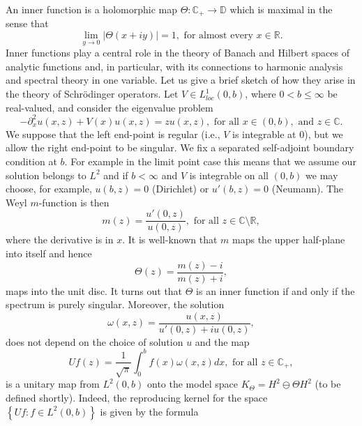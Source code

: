 \documentclass{article}[12pt]
\theoremstyle{remark}
\begin{document}
An inner function is a holomorphic map $\Theta : \mathbb{C}_{+} \to \mathbb{D}$ which is maximal in the sense that
\begin{equation*}
    \lim_{y\to 0} \lvert \Theta(x+iy)\rvert = 1, \text{ for almost every } x \in \mathbb{R}.
\end{equation*}
Inner functions play a central role in the theory of Banach and Hilbert spaces of analytic functions and, in particular, with its connections to harmonic analysis and spectral theory in one variable. Let us give a brief sketch of how they arise in the theory of Schrödinger operators. Let $V \in L^{1}_{loc}(0,b)$, where $0<b\leq \infty$ be real-valued, and consider the eigenvalue problem
\begin{equation}\label{eq:schrödinger}
    -\partial_{x}^{2}u(x,z) + V(x)u(x,z) = zu(x,z), \text{ for all } x\in (0,b), \text{ and }z \in \mathbb{C}.
\end{equation}
We suppose that the left end-point is regular (i.e., $V$ is integrable at $0$), but we allow the right end-point to be singular. We fix a separated self-adjoint boundary condition at $b$. For example in the limit point case this means that we assume our solution belongs to $L^{2}$ and if $b < \infty$ and $V$ is integrable on all $(0,b)$ we may choose, for example, $u(b,z) = 0$ (Dirichlet) or $u'(b,z) = 0$ (Neumann). The Weyl $m$-function is then
\begin{equation*}
    m(z) = \frac{u'(0,z)}{u(0,z)}, \text{ for all } z \in \mathbb{C} \setminus \mathbb{R},
\end{equation*}
where the derivative is in $x$. It is well-known that $m$ maps the upper half-plane into itself and hence
\begin{equation*}
    \Theta(z) = \frac{m(z)-i}{m(z)+i},
\end{equation*}
maps into the unit disc. It turns out that $\Theta$ is an inner function if and only if the spectrum is purely singular. Moreover, the solution
\begin{equation*}
    \omega(x,z) = \frac{u(x,z)}{u'(0,z)+iu(0,z)},    
\end{equation*}
does not depend on the choice of solution $u$ and the map
\begin{equation*}
    Uf(z) = \frac{1}{\sqrt{\pi}}\int_{0}^{b} f(x)\omega(x,z)dx, \text{ for all } z \in \mathbb{C}_{+},    
\end{equation*}
is a unitary map from $L^{2}(0,b)$ onto the model space $K_{\Theta} = H^{2} \ominus \Theta H^{2}$ (to be defined shortly). Indeed, the reproducing kernel for the space $\left\{ Uf : f \in L^{2}(0,b)\right\}$ is given by the formula
\end{document}
